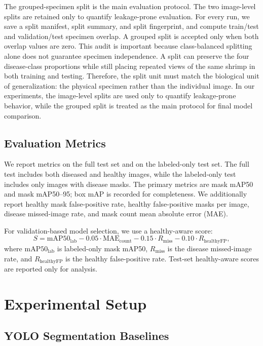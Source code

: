 \documentclass{svproc}
\begin{document}
The grouped-specimen split is the main evaluation protocol. The two image-level splits are retained only to quantify leakage-prone evaluation. For every run, we save a split manifest, split summary, and split fingerprint, and compute train/test and validation/test specimen overlap. A grouped split is accepted only when both overlap values are zero. 
This audit is important because class-balanced splitting alone does not guarantee specimen independence. A split can preserve the four disease-class proportions while still placing repeated views of the same shrimp in both training and testing. Therefore, the split unit must match the biological unit of generalization: the physical specimen rather than the individual image. In our experiments, the image-level splits are used only to quantify leakage-prone behavior, while the grouped split is treated as the main protocol for final model comparison.

\subsection{Evaluation Metrics}

We report metrics on the full test set and on the labeled-only test set. The full test includes both diseased and healthy images, while the labeled-only test includes only images with disease masks. The primary metrics are mask mAP50 and mask mAP50--95; box mAP is recorded for completeness. We additionally report healthy mask false-positive rate, healthy false-positive masks per image, disease missed-image rate, and mask count mean absolute error (MAE).

For validation-based model selection, we use a healthy-aware score:
\begin{equation}
S =
\mathrm{mAP50}_{\mathrm{lab}}
- 0.05 \cdot \mathrm{MAE}_{\mathrm{count}}
- 0.15 \cdot R_{\mathrm{miss}}
- 0.10 \cdot R_{\mathrm{healthyFP}},
\end{equation}
where $\mathrm{mAP50}_{\mathrm{lab}}$ is labeled-only mask mAP50, $R_{\mathrm{miss}}$ is the disease missed-image rate, and $R_{\mathrm{healthyFP}}$ is the healthy false-positive rate. Test-set healthy-aware scores are reported only for analysis.

\section{Experimental Setup}

\subsection{YOLO Segmentation Baselines}
\end{document}
